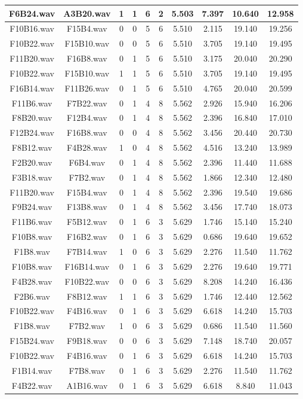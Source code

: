 \documentclass[11pt,a4paper,twoside]{book}
\begin{document}
\begin{longtable}[c]{|c|c|c|c|c|c|c|c|c|c|}
F6B24.wav&A3B20.wav&1&1&6&2&5.503&7.397&10.640&12.958\\ \hline
F10B16.wav&F15B4.wav&0&0&5&6&5.510&2.115&19.140&19.256\\ \hline
F10B22.wav&F15B10.wav&0&0&5&6&5.510&3.705&19.140&19.495\\ \hline
F11B20.wav&F16B8.wav&0&1&5&6&5.510&3.175&20.040&20.290\\ \hline
F10B22.wav&F15B10.wav&1&1&5&6&5.510&3.705&19.140&19.495\\ \hline
F16B14.wav&F11B26.wav&0&1&5&6&5.510&4.765&20.040&20.599\\ \hline
F11B6.wav&F7B22.wav&0&1&4&8&5.562&2.926&15.940&16.206\\ \hline
F8B20.wav&F12B4.wav&0&1&4&8&5.562&2.396&16.840&17.010\\ \hline
F12B24.wav&F16B8.wav&0&0&4&8&5.562&3.456&20.440&20.730\\ \hline
F8B12.wav&F4B28.wav&1&0&4&8&5.562&4.516&13.240&13.989\\ \hline
F2B20.wav&F6B4.wav&0&1&4&8&5.562&2.396&11.440&11.688\\ \hline
F3B18.wav&F7B2.wav&0&1&4&8&5.562&1.866&12.340&12.480\\ \hline
F11B20.wav&F15B4.wav&0&1&4&8&5.562&2.396&19.540&19.686\\ \hline
F9B24.wav&F13B8.wav&0&1&4&8&5.562&3.456&17.740&18.073\\ \hline
F11B6.wav&F5B12.wav&0&1&6&3&5.629&1.746&15.140&15.240\\ \hline
F10B8.wav&F16B2.wav&0&1&6&3&5.629&0.686&19.640&19.652\\ \hline
F1B8.wav&F7B14.wav&1&0&6&3&5.629&2.276&11.540&11.762\\ \hline
F10B8.wav&F16B14.wav&0&1&6&3&5.629&2.276&19.640&19.771\\ \hline
F4B28.wav&F10B22.wav&0&0&6&3&5.629&8.208&14.240&16.436\\ \hline
F2B6.wav&F8B12.wav&1&1&6&3&5.629&1.746&12.440&12.562\\ \hline
F10B22.wav&F4B16.wav&0&1&6&3&5.629&6.618&14.240&15.703\\ \hline
F1B8.wav&F7B2.wav&1&0&6&3&5.629&0.686&11.540&11.560\\ \hline
F15B24.wav&F9B18.wav&0&0&6&3&5.629&7.148&18.740&20.057\\ \hline
F10B22.wav&F4B16.wav&0&1&6&3&5.629&6.618&14.240&15.703\\ \hline
F1B14.wav&F7B8.wav&0&1&6&3&5.629&2.276&11.540&11.762\\ \hline
F4B22.wav&A1B16.wav&0&1&6&3&5.629&6.618&8.840&11.043\\ \hline

\end{longtable}
\end{document}
